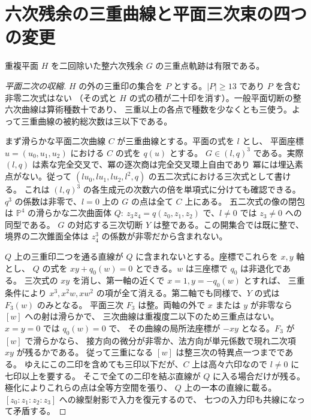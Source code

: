 \section{六次残余の三重曲線と平面三次束の四つの変更}
\label{sec:sextic-residual-triple-curves}
\begin{theorem}\label{thm:sextic-residual-triple-curves}
重複平面 $H$ を二回除いた整六次残余 $G$ の三重点軌跡は有限である。
\end{theorem}
\begin{proof}[平面二次の収縮]
$H$ の外の三重印の集合を $P$ とする。$|P|\ge13$ であり $P$ を含む非零二次式はない
（その式と $H$ の式の積が二十印を消す）。一般平面切断の整六次曲線は算術種数十であり、
三重以上の各点で種数を少なくとも三使う。よって三重曲線の被約総次数は三以下である。

まず滑らかな平面二次曲線 $C$ が三重曲線とする。平面の式を $l$ とし、
平面座標 $u=(u_0,u_1,u_2)$ における $C$ の式を $q(u)$ とする。
$G\in(l,q)^3$ である。実際 $(l,q)$ は素な完全交叉で、冪の逐次商は完全交叉環上自由であり
冪には埋込素点がない。従って $(lu_0,lu_1,lu_2,l^2,q)$ の五二次式における三次式として書ける。
これは $(l,q)^3$ の各生成元の次数六の倍を単項式に分けても確認できる。
$q^3$ の係数は非零で、$l=0$ 上の $G$ の点は全て $C$ 上にある。
五二次式の像の閉包は $\mathbb P^4$ の滑らかな二次曲面体
$Q:\ z_3 z_4=q(z_0,z_1,z_2)$ で、$l\ne0$ では $z_3\ne0$ への同型である。
$G$ の対応する三次切断 $Y$ は整である。この開集合では既に整で、境界の二次錐面全体は
$z_4^3$ の係数が非零だから含まれない。

$Q$ 上の三重印二つを通る直線が $Q$ に含まれないとする。座標でこれらを $x,y$ 軸とし、
$Q$ の式を $xy+q_0(w)=0$ とできる。$w$ は三座標で $q_0$ は非退化である。
三次式の $xy$ を消し、第一軸の近くで $x=1,y=-q_0(w)$ とすれば、
三重条件により $x^3,x^2w,xw^2$ の項が全て消える。第二軸でも同様で、$Y$ の式は $F_3(w)$ のみとなる。
平面三次 $F_3$ は整。両軸の外で $x$ または $y$ が非零なら $[w]$ への射は滑らかで、
三次曲線は重複度二以下のため三重点はない。$x=y=0$ では $q_0(w)=0$ で、
その曲線の局所法座標が $-xy$ となる。$F_3$ が $[w]$ で滑らかなら、
接方向の微分が非零か、法方向が単元係数で現れ二次項 $xy$ が残るかである。
従って三重になる $[w]$ は整三次の特異点一つまでである。
ゆえにこの二印を含めても三印以下だが、$C$ 上は高々六印なので $l\ne0$ に七印以上を要する。
そこで全ての二印を結ぶ直線が $Q$ に入る場合だけが残る。極化によりこれらの点は全等方空間を張り、
$Q$ 上の一本の直線に載る。$[z_0:z_1:z_2:z_3]$ への線型射影で入力を復元するので、
七つの入力印も共線になって矛盾する。
\end{proof}
